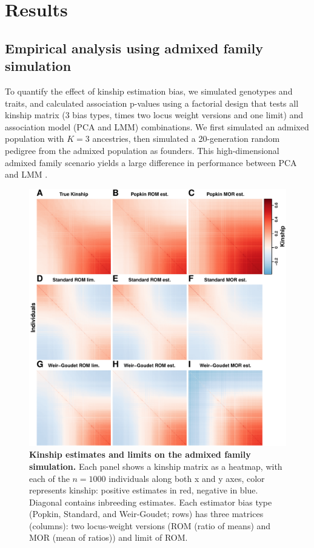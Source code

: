 \documentclass[11pt]{article}
\begin{document}
\section{Results}

\graphicspath{ {../data/} }

\subsection{Empirical analysis using admixed family simulation}

To quantify the effect of kinship estimation bias, we simulated genotypes and traits, and calculated association p-values using a factorial design that tests all kinship matrix (3 bias types, times two locus weight versions and one limit) and association model (PCA and LMM) combinations.
We first simulated an admixed population with $K=3$ ancestries, then simulated a 20-generation random pedigree from the admixed population as founders.
This high-dimensional admixed family scenario yields a large difference in performance between PCA and LMM \citep{yao_limitations_2022}.

\begin{figure}[bp!]
  \centering
  \includegraphics[height=0.8\textheight]{sim-admix-n1000-m100000-k3-f0.3-s0.5-mc100-h0.8-g20-fes/kinship.pdf}
  \caption{
    {\bf Kinship estimates and limits on the admixed family simulation.}
    Each panel shows a kinship matrix as a heatmap, with each of the $n=1000$ individuals along both x and y axes, color represents kinship: positive estimates in red, negative in blue.
    Diagonal contains inbreeding estimates.
    Each estimator bias type (Popkin, Standard, and Weir-Goudet; rows) has three matrices (columns): two locus-weight versions (ROM (ratio of means) and MOR (mean of ratios)) and limit of ROM.
  }
  \label{fig:kinship_sim}
\end{figure}
\end{document}
